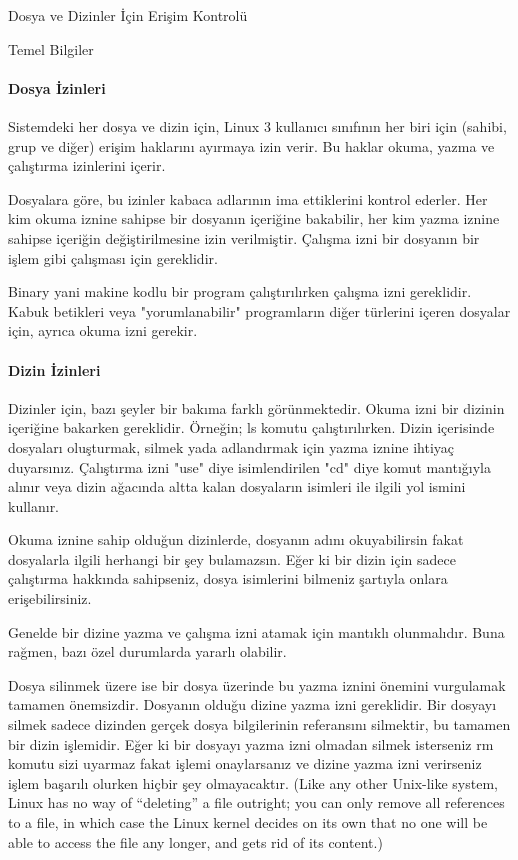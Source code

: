 \begin{section}{Dosya ve Dizinler İçin Erişim Kontrolü}
\begin{subsection}{Temel Bilgiler}
\paragraph{Dosya İzinleri}{Sistemdeki her dosya ve dizin için, Linux 3 kullanıcı sınıfının her biri için (sahibi, grup ve diğer) erişim haklarını ayırmaya izin verir. Bu haklar okuma, yazma ve çalıştırma izinlerini içerir.}

Dosyalara göre, bu izinler kabaca adlarının ima ettiklerini kontrol ederler. Her kim okuma iznine sahipse bir dosyanın içeriğine bakabilir, her kim yazma iznine sahipse içeriğin değiştirilmesine izin verilmiştir. Çalışma izni bir dosyanın bir işlem gibi çalışması için gereklidir.

Binary yani makine kodlu bir program çalıştırılırken çalışma izni gereklidir. Kabuk betikleri veya "yorumlanabilir" programların diğer türlerini içeren dosyalar için, ayrıca okuma izni gerekir.

\paragraph{Dizin İzinleri}{Dizinler için, bazı şeyler bir bakıma farklı görünmektedir. Okuma izni bir dizinin içeriğine bakarken gereklidir. Örneğin; ls komutu çalıştırılırken. Dizin içerisinde dosyaları oluşturmak, silmek yada adlandırmak için yazma iznine ihtiyaç duyarsınız. Çalıştırma izni "use" diye isimlendirilen "cd" diye komut mantığıyla alınır veya dizin ağacında altta kalan dosyaların isimleri ile ilgili yol ismini kullanır.}

Okuma iznine sahip olduğun dizinlerde, dosyanın adını okuyabilirsin fakat dosyalarla ilgili herhangi bir şey bulamazsın. Eğer ki bir dizin için sadece çalıştırma hakkında sahipseniz, dosya isimlerini bilmeniz şartıyla onlara erişebilirsiniz.

Genelde bir dizine yazma ve çalışma izni atamak için mantıklı olunmalıdır. Buna rağmen, bazı özel durumlarda yararlı olabilir.

Dosya silinmek üzere ise bir dosya üzerinde bu yazma iznini önemini vurgulamak tamamen önemsizdir. Dosyanın olduğu dizine yazma izni gereklidir. Bir dosyayı silmek sadece dizinden gerçek dosya bilgilerinin referansını silmektir, bu tamamen bir dizin işlemidir. Eğer ki bir dosyayı yazma izni olmadan silmek isterseniz rm komutu sizi uyarmaz fakat işlemi onaylarsanız ve dizine yazma izni verirseniz işlem başarılı olurken hiçbir şey olmayacaktır. (Like any other Unix-like system, Linux has no way of “deleting” a file outright; you can only remove all references to a file, in which case the Linux kernel decides on its own that no one will be able to access the file any longer, and gets rid of its content.)


\end{subsection}
\end{section}
